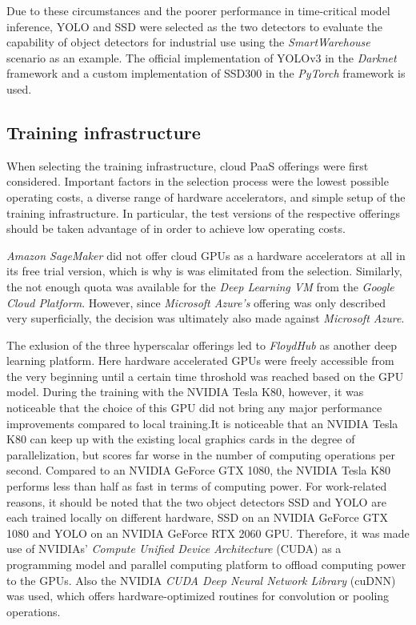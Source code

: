 \documentclass[a4paper, 10pt, journal]{wissarbIEEE}      %
\begin{document}
Due to these circumstances and the poorer performance in time-critical model inference, YOLO and SSD were selected as the two detectors to evaluate the capability of object detectors for industrial use using the \textit{SmartWarehouse} scenario as an example. The official implementation of YOLOv3 in the \textit{Darknet} framework and a custom implementation of SSD300 in the \textit{PyTorch} framework is used.

\subsection{Training infrastructure}

When selecting the training infrastructure, cloud PaaS offerings were first considered. Important factors in the selection process were the lowest possible operating costs, a diverse range of hardware accelerators, and simple setup of the training infrastructure. In particular, the test versions of the respective offerings should be taken advantage of in order to achieve low operating costs.

\textit{Amazon SageMaker} did not offer cloud GPUs as a hardware accelerators at all in its free trial version, which is why is was elimitated from the selection. Similarly, the not enough quota was available for the \textit{Deep Learning VM} from the  \textit{Google Cloud Platform}. However, since \textit{Microsoft Azure's} offering was only described very superficially, the decision was ultimately also made against \textit{Microsoft Azure}.

The exlusion of the three hyperscalar offerings led to \textit{FloydHub} as another deep learning platform. Here hardware accelerated GPUs were freely accessible from the very beginning until a certain time throshold was reached based on the GPU model. During the training with the NVIDIA Tesla K80, however, it was noticeable that the choice of this GPU did not bring any major performance improvements compared to local training.It is noticeable that an NVIDIA Tesla K80 can keep up with the existing local graphics cards in the degree of parallelization, but scores far worse in the number of computing operations per second. Compared to an NVIDIA GeForce GTX 1080, the NVIDIA Tesla K80 performs less than half as fast in terms of computing power. For work-related reasons, it should be noted that the two object detectors SSD and YOLO are each trained locally on different hardware, SSD on an NVIDIA GeForce GTX 1080 and YOLO on an NVIDIA GeForce RTX 2060 GPU. Therefore, it was made use of NVIDIAs' \textit{Compute Unified Device Architecture} (CUDA) as a programming model and parallel computing platform to offload computing power to the GPUs. Also the NVIDIA \textit{CUDA Deep Neural Network Library} (cuDNN) was used, which offers hardware-optimized routines for convolution or pooling operations. 
\end{document}
